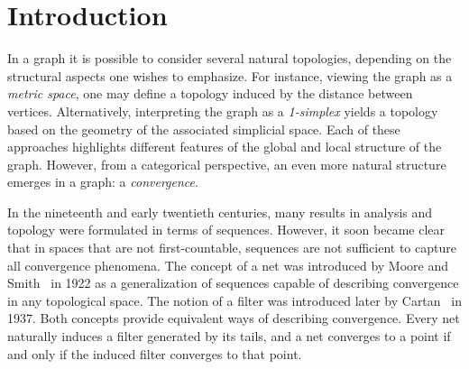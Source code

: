 \documentclass{amsart}
\theoremstyle{definition}
\theoremstyle{remark}
\numberwithin{equation}{section}
\begin{document}

\maketitle

\section*{Introduction}


 In a graph it is possible to consider several natural topologies, depending on the structural aspects one wishes to emphasize. For instance, viewing the graph as a \emph{metric space}, one may define a topology induced by the distance between vertices. Alternatively, interpreting the graph as a \emph{1-simplex} yields a topology based on the geometry of the associated simplicial space. Each of these approaches highlights different features of the global and local structure of the graph. However, from a categorical perspective, an even more natural structure emerges in a graph: a \emph{convergence}.

In the nineteenth and early twentieth centuries, many results in analysis
and topology were formulated in terms of sequences. However, it soon
became clear that in spaces that are not first-countable, sequences are
not sufficient to capture all convergence phenomena. The concept of a
net was introduced by Moore and Smith~\cite{MooreSmith1922}
in 1922 as a generalization of sequences capable of describing
convergence in any topological space. The notion of a filter was
introduced later by Cartan~\cite{cartan1} in 1937. Both concepts provide equivalent ways of describing convergence.
Every net naturally induces a filter generated by its tails,
and a net converges to a point if and only if the induced filter
converges to that point. 
\end{document}
